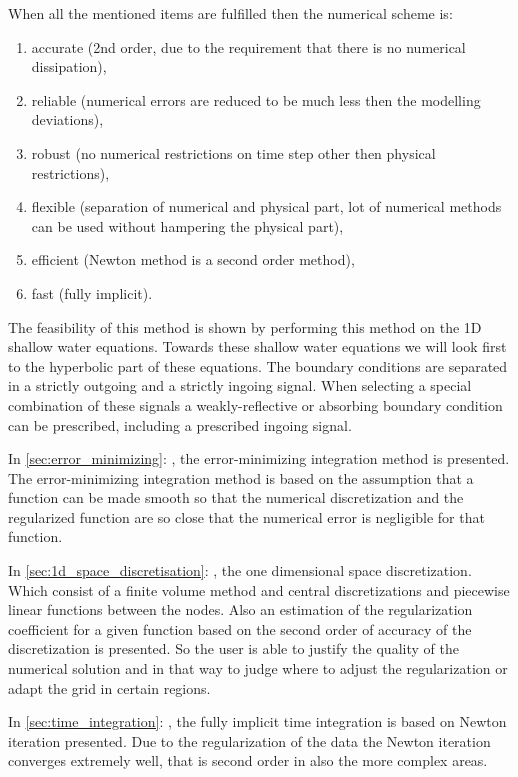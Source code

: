 When all the mentioned items are fulfilled then the numerical scheme is:
\begin{enumerate}
\item accurate (2nd order, due to the requirement that there is no numerical dissipation),
\item reliable (numerical errors are reduced to be much less then the modelling deviations),
\item robust (no numerical restrictions on time step other then physical restrictions),
\item flexible (separation of numerical and physical part, lot of numerical methods can be used without hampering the physical part),
\item efficient (Newton method is a second order method),
\item fast (fully implicit).
\end{enumerate}

The feasibility of this method is shown by performing this method on the 1D shallow water equations.
Towards these shallow water equations we will look first to the hyperbolic part of these equations.
The boundary conditions are separated in a strictly outgoing and a strictly ingoing signal.
When selecting a special combination of these signals a weakly-reflective or absorbing boundary condition can be prescribed, including a prescribed ingoing signal.




In \autoref{sec:error_minimizing}: , the error-minimizing integration method is presented.
The error-minimizing integration method is based on the assumption that a function can be made smooth so that the numerical discretization and the regularized function are so close that the numerical error is negligible for that function.

In \autoref{sec:1d_space_discretisation}: , the one dimensional space discretization.
Which consist of a finite volume method and central discretizations and piecewise linear functions between the nodes.
Also an estimation of the regularization coefficient for a given function based on the second order of accuracy of the discretization is presented.
So the user is able to justify the quality of the numerical solution and in that way to judge where to adjust the regularization or adapt the grid in certain regions.


In \autoref{sec:time_integration}: , the fully implicit time integration is based on Newton iteration presented. Due to the regularization of the data the Newton iteration converges extremely well, that is second order in also the more complex areas.

